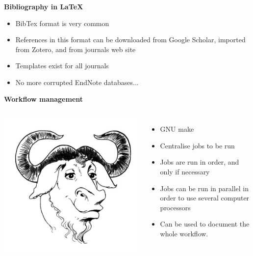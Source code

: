 \documentclass[9pt,xcolor=pdftex,dvipsnames,table]{beamer}
\begin{document}
\begin{frame}{\textbf{Bibliography in LaTeX}}
  \begin{itemize}
  \item BibTex format is very common
  \item References in this format can be downloaded from Google
    Scholar, imported from Zotero, and from journals web site
  \item Templates exist for all journals
  \item No more corrupted EndNote databases...
  \end{itemize}
\end{frame}


\begin{frame}{\textbf{Workflow management}}
\begin{columns}
\centering
\includegraphics[width=1\textwidth]{images/make-logo.jpg}
  \begin{itemize}
  \item GNU make
  \item Centralise jobs to be run
  \item Jobs are run in order, and only if necessary
  \item Jobs can be run in parallel in order to use several computer processors
  \item Can be used to document the whole workflow.
  \end{itemize}
\end{columns}
\end{frame}
\end{document}
